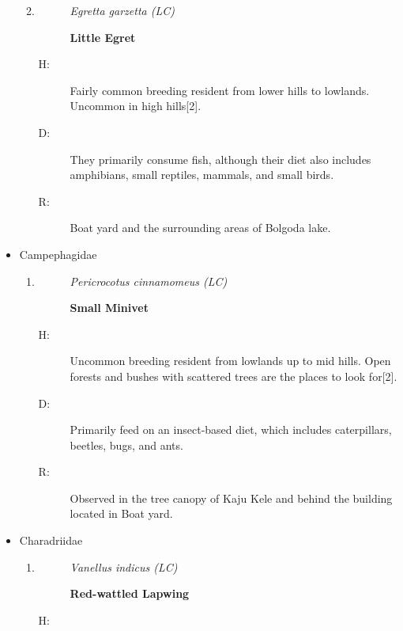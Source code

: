 \begin{itemize}
\begin{enumerate}
\begin{description}
\end{description}%
\item%
\begin{description}%
\item[]%
\textit{Egretta garzetta (LC)}%
\item[]%
\textbf{Little Egret}%
\end{description}%
\begin{description}%
\item[H: ]%
Fairly common breeding resident from lower hills to lowlands. Uncommon in high hills{[}2{]}.%
\item[D: ]%
They primarily consume fish, although their diet also includes amphibians, small reptiles, mammals, and small birds.%
\item[R: ]%
Boat yard and the surrounding areas of Bolgoda lake.%
\end{description}%
\end{enumerate}%
\item%
Campephagidae%
\begin{enumerate}%
\item%
\begin{description}%
\item[]%
\textit{Pericrocotus cinnamomeus (LC)}%
\item[]%
\textbf{Small Minivet}%
\end{description}%
\begin{description}%
\item[H: ]%
Uncommon breeding resident from lowlands up to mid hills. Open forests and bushes with scattered trees are the places to look for{[}2{]}.%
\item[D: ]%
Primarily feed on an insect{-}based diet, which includes caterpillars, beetles, bugs, and ants.%
\item[R: ]%
Observed in the tree canopy of Kaju Kele and behind the building located in Boat yard.%
\end{description}%
\end{enumerate}%
\item%
Charadriidae%
\begin{enumerate}%
\item%
\begin{description}%
\item[]%
\textit{Vanellus indicus (LC)}%
\item[]%
\textbf{Red{-}wattled Lapwing}%
\end{description}%
\begin{description}%
\item[H: ]%

\end{description}
\end{enumerate}
\end{itemize}
